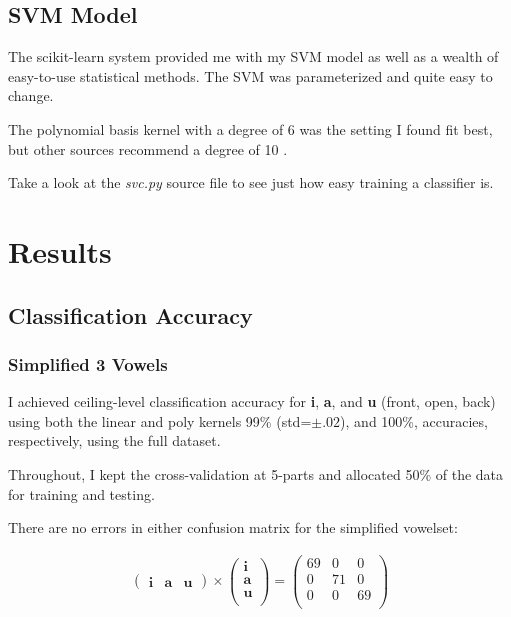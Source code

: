 \documentclass[twoside]{article}
\begin{document}
\begin{multicols}{2}
\subsection{SVM Model}

The scikit-learn \cite{sklearn} system provided me with my SVM model as well as a wealth of easy-to-use statistical methods.  The SVM was parameterized and quite easy to change.

The polynomial basis kernel with a degree of 6 was the setting I found fit best, but other sources recommend a degree of 10 \cite{smo}.

Take a look at the \textit{svc.py} source file to see just how easy training a classifier is.

\section{Results}

\subsection{Classification Accuracy}

\subsubsection{Simplified 3 Vowels}

I achieved ceiling-level classification accuracy for \textbf{i}, \textbf{a}, and \textbf{u} (front, open, back) using both the linear and poly kernels 99\% (std=$\pm.02$), and 100\%, accuracies, respectively, using the full dataset.

Throughout, I kept the cross-validation at 5-parts and allocated 50\% of the data for training and testing.

There are no errors in either confusion matrix for the simplified vowelset:

\begin{align}
\begin{pmatrix}
	\textbf{i} & \textbf{a} & \textbf{u}
\end{pmatrix} \times
\begin{pmatrix}
	\textbf{i} \\
	\textbf{a} \\
	\textbf{u} \\
\end{pmatrix} =
\begin{pmatrix}
69 & 0  & 0   \\
 0 & 71 & 0   \\
 0 & 0  & 69  \\
\end{pmatrix}
\end{align}


\end{multicols}
\end{document}
